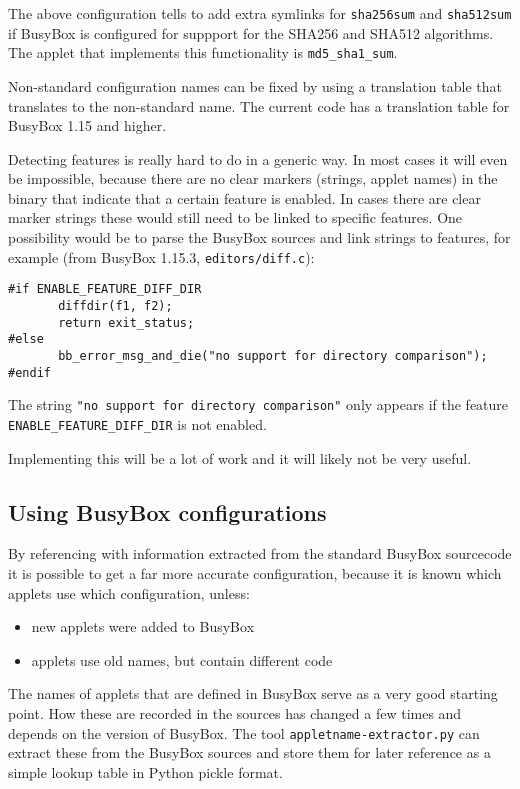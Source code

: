 \documentclass[10pt]{article}
\begin{document}
The above configuration tells to add extra symlinks for \texttt{sha256sum} and
\texttt{sha512sum} if BusyBox is configured for suppport for the SHA256 and
SHA512 algorithms. The applet that implements this functionality is
\texttt{md5\_sha1\_sum}.

Non-standard configuration names can be fixed by using a translation table that
translates to the non-standard name. The current code has a translation table
for BusyBox 1.15 and higher.

Detecting features is really hard to do in a generic way. In most cases it will
even be impossible, because there are no clear markers (strings, applet names)
in the binary that indicate that a certain feature is enabled. In cases there
are clear marker strings these would still need to be linked to specific
features. One possibility would be to parse the BusyBox sources and link
strings to features, for example (from BusyBox 1.15.3,
\texttt{editors/diff.c}):

\begin{verbatim}
#if ENABLE_FEATURE_DIFF_DIR
       diffdir(f1, f2);
       return exit_status;
#else
       bb_error_msg_and_die("no support for directory comparison");
#endif
\end{verbatim}

The string \texttt{"no support for directory comparison"} only appears if the
feature \texttt{ENABLE\_FEATURE\_DIFF\_DIR} is not enabled.

Implementing this will be a lot of work and it will likely not be very useful.

\subsection{Using BusyBox configurations}

By referencing with information extracted from the standard BusyBox sourcecode
it is possible to get a far more accurate configuration, because it is known
which applets use which configuration, unless:

\begin{itemize}
\item new applets were added to BusyBox
\item applets use old names, but contain different code
\end{itemize}

The names of applets that are defined in BusyBox serve as a very good starting
point. How these are recorded in the sources has changed a few times and
depends on the version of BusyBox. The tool \texttt{appletname-extractor.py}
can extract these from the BusyBox sources and store them for later reference
as a simple lookup table in Python pickle format.
\end{document}
